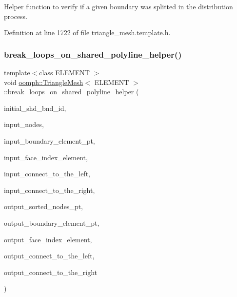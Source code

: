 Helper function to verify if a given boundary was splitted in the distribution process. 



Definition at line 1722 of file triangle\+\_\+mesh.\+template.\+h.

\mbox{\label{classoomph_1_1TriangleMesh_a191f27cfdca85947cb9391f6d593723f}} 
\subsubsection{\texorpdfstring{break\+\_\+loops\+\_\+on\+\_\+shared\+\_\+polyline\+\_\+helper()}{break\_loops\_on\_shared\_polyline\_helper()}}
{\footnotesize\ttfamily template$<$class E\+L\+E\+M\+E\+NT $>$ \\
void \hyperlink{classoomph_1_1TriangleMesh}{oomph\+::\+Triangle\+Mesh}$<$ E\+L\+E\+M\+E\+NT $>$\+::break\+\_\+loops\+\_\+on\+\_\+shared\+\_\+polyline\+\_\+helper (\begin{DoxyParamCaption}\item[{const unsigned \&}]{initial\+\_\+shd\+\_\+bnd\+\_\+id,  }\item[{std\+::list$<$ Node $\ast$$>$ \&}]{input\+\_\+nodes,  }\item[{Vector$<$ Finite\+Element $\ast$$>$ \&}]{input\+\_\+boundary\+\_\+element\+\_\+pt,  }\item[{Vector$<$ int $>$ \&}]{input\+\_\+face\+\_\+index\+\_\+element,  }\item[{const int \&}]{input\+\_\+connect\+\_\+to\+\_\+the\+\_\+left,  }\item[{const int \&}]{input\+\_\+connect\+\_\+to\+\_\+the\+\_\+right,  }\item[{Vector$<$ std\+::list$<$ Node $\ast$$>$ $>$ \&}]{output\+\_\+sorted\+\_\+nodes\+\_\+pt,  }\item[{Vector$<$ Vector$<$ Finite\+Element $\ast$$>$ $>$ \&}]{output\+\_\+boundary\+\_\+element\+\_\+pt,  }\item[{Vector$<$ Vector$<$ int $>$ $>$ \&}]{output\+\_\+face\+\_\+index\+\_\+element,  }\item[{Vector$<$ int $>$ \&}]{output\+\_\+connect\+\_\+to\+\_\+the\+\_\+left,  }\item[{Vector$<$ int $>$ \&}]{output\+\_\+connect\+\_\+to\+\_\+the\+\_\+right }\end{DoxyParamCaption})\hspace{0.3cm}{\ttfamily [protected]}}




